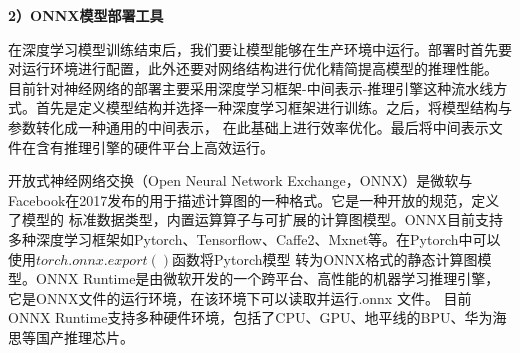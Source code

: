 \textbf{2）ONNX模型部署工具}

在深度学习模型训练结束后，我们要让模型能够在生产环境中运行。部署时首先要对运行环境进行配置，此外还要对网络结构进行优化精简提高模型的推理性能。
目前针对神经网络的部署主要采用深度学习框架-中间表示-推理引擎这种流水线方式。首先是定义模型结构并选择一种深度学习框架进行训练。之后，将模型结构与参数转化成一种通用的中间表示，
在此基础上进行效率优化。最后将中间表示文件在含有推理引擎的硬件平台上高效运行。

开放式神经网络交换（Open Neural Network Exchange，ONNX）是微软与Facebook在2017发布的用于描述计算图的一种格式。它是一种开放的规范，定义了模型的
标准数据类型，内置运算算子与可扩展的计算图模型。ONNX目前支持多种深度学习框架如Pytorch、Tensorflow、Caffe2、Mxnet等。在Pytorch中可以使用$torch.onnx.export()$函数将Pytorch模型
转为ONNX格式的静态计算图模型。ONNX Runtime是由微软开发的一个跨平台、高性能的机器学习推理引擎，它是ONNX文件的运行环境，在该环境下可以读取并运行.onnx 文件。
目前ONNX Runtime支持多种硬件环境，包括了CPU、GPU、地平线的BPU、华为海思等国产推理芯片。
